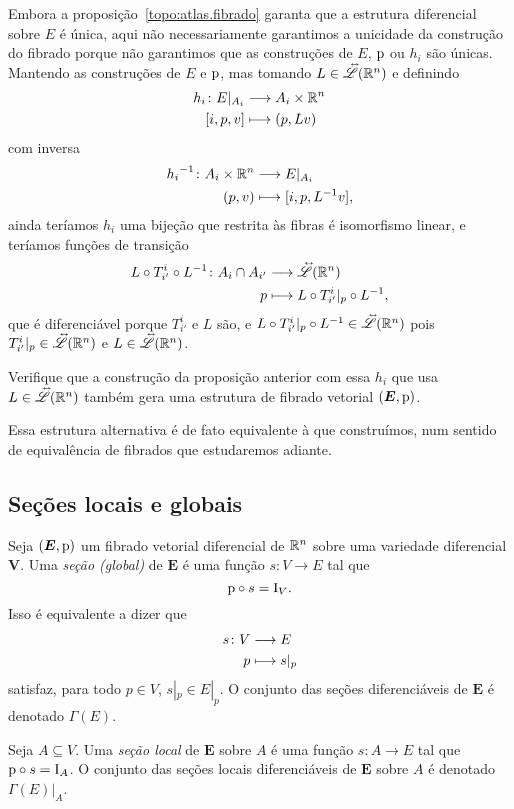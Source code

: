 Embora a proposição~\ref{topo:atlas.fibrado} garanta que a estrutura diferencial sobre $E$ é única, aqui não necessariamente garantimos a unicidade da construção do fibrado porque não garantimos que as construções de $E$, $\mathrm{p}$ ou $h_i$ são únicas. Mantendo as construções de $E$ e $\mathrm{p}$, mas tomando $L \in \accentset{\leftrightarrow}{\mathscr{L}}(\mathbb{R}^n)$ e definindo
	\begin{align*}
	{h_i}\colon {E|_{A_i}} &\longrightarrow {A_i \times \mathbb{R}^n} \\{[i,p,v]} &\longmapsto (p,L v)
	\end{align*}
com inversa
	\begin{align*}
	{{h_i}^{-1}}\colon {A_i \times \mathbb{R}^n} &\longrightarrow {E|_{A_i}} \\{(p,v)} &\longmapsto [i,p,L^{-1} v],
	\end{align*}
ainda teríamos $h_i$ uma bijeção que restrita às fibras é isomorfismo linear, e teríamos funções de transição
	\begin{align*}
	{L \circ T^i_{i'} \circ L^{-1}}\colon {A_i \cap A_{i'}} &\longrightarrow {\accentset{\leftrightarrow}{\mathscr{L}}(\mathbb{R}^n)} \\{p} &\longmapsto L \circ T^i_{i'}|_p \circ L^{-1},
	\end{align*}
que é diferenciável porque $T^i_{i'}$ e $L$ são, e $L \circ T^i_{i'}|_p \circ L^{-1} \in \accentset{\leftrightarrow}{\mathscr{L}}(\mathbb{R}^n)$ pois $T^i_{i'}|_p \in \accentset{\leftrightarrow}{\mathscr{L}}(\mathbb{R}^n)$ e $L \in \accentset{\leftrightarrow}{\mathscr{L}}(\mathbb{R}^n)$.

\begin{exercise}
Verifique que a construção da proposição anterior com essa $h_i$ que usa $L \in \accentset{\leftrightarrow}{\mathscr{L}}(\mathbb{R}^n)$ também gera uma estrutura de fibrado vetorial $(\bm E,\mathrm{p})$.
\end{exercise}

Essa estrutura alternativa é de fato equivalente à que construímos, num sentido de equivalência de fibrados que estudaremos adiante.





\subsection{Seções locais e globais}

\newcommand{\Sec}{\Gamma}

\begin{definition}
Seja $(\bm E,\mathrm{p})$ um fibrado vetorial diferencial de $\mathbb{R}^n$ sobre uma variedade diferencial $\bm V$. Uma \emph{seção (global)} de $\bm E$ é uma função $s\colon V \to E$ tal que
	\begin{equation*}
	\mathrm{p} \circ s = \mathrm{I}_V.
	\end{equation*}
Isso é equivalente a dizer que
	\begin{align*}
	{s}\colon {V} &\longrightarrow {E} \\{p} &\longmapsto s|_p
	\end{align*}
satisfaz, para todo $p \in V$, $s|_p \in E|_p$. O conjunto das seções diferenciáveis de $\bm E$ é denotado $\Sec(E)$.

Seja $A \subseteq V$. Uma \emph{seção local} de $\bm E$ sobre $A$ é uma função $s\colon A \to E$ tal que $\mathrm{p} \circ s = \mathrm{I}_A$. O conjunto das seções locais diferenciáveis de $\bm E$ sobre $A$ é denotado $\Sec(E)|_A$.
\end{definition}


